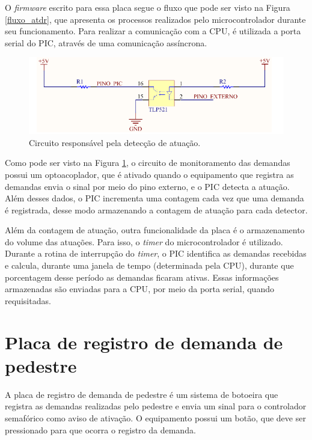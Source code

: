 O \textit{firmware} escrito para essa placa segue o fluxo que pode ser visto na Figura \ref{fluxo_atdr}, que apresenta os processos realizados pelo microcontrolador durante seu funcionamento. Para realizar a comunicação com a \ac{CPU}, é utilizada a porta serial do PIC, através de uma comunicação assíncrona. 

\begin{figure}[ht]
    \begin{center}
    \includegraphics{figuras/atuacao.PNG}
    \end{center}
    \caption[Circuito de atuador]{Circuito responsável pela detecção de atuação.}
    \label{atdr}
\end{figure}

Como pode ser visto na Figura \ref{atdr}, o circuito de monitoramento das demandas possui um optoacoplador, que é ativado quando o equipamento que registra as demandas envia o sinal por meio do pino externo, e o PIC detecta a atuação. Além desses dados, o PIC incrementa uma contagem cada vez que uma demanda é registrada, desse modo armazenando a contagem de atuação para cada detector.

Além da contagem de atuação, outra funcionalidade da placa é o armazenamento do volume das atuações. Para isso, o \textit{timer} do microcontrolador é utilizado. Durante a rotina de interrupção do \textit{timer}, o PIC identifica as demandas recebidas e calcula, durante uma janela de tempo (determinada pela \ac{CPU}), durante que porcentagem desse período as demandas ficaram ativas. Essas informações armazenadas são enviadas para a \ac{CPU}, por meio da porta serial, quando requisitadas.

\section{Placa de registro de demanda de pedestre}

A placa de registro de demanda de pedestre é um sistema de botoeira que registra as demandas realizadas pelo pedestre e envia um sinal para o controlador semafórico como aviso de ativação. O equipamento possui um botão, que deve ser pressionado para que ocorra o registro da demanda. 

